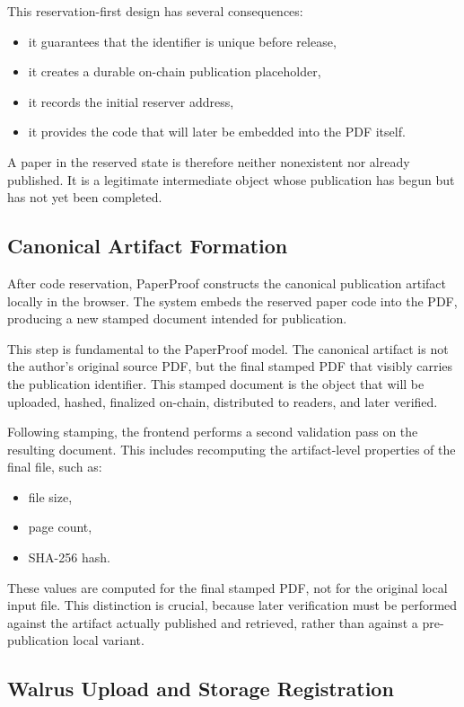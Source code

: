 \documentclass[journal]{IEEEtran}
\begin{document}
This reservation-first design has several consequences:
\begin{itemize}
    \item it guarantees that the identifier is unique before release,
    \item it creates a durable on-chain publication placeholder,
    \item it records the initial reserver address,
    \item it provides the code that will later be embedded into the PDF itself.
\end{itemize}


A paper in the reserved state is therefore neither nonexistent nor already published. It is a legitimate intermediate object whose publication has begun but has not yet been completed.

\subsection{Canonical Artifact Formation}

After code reservation, PaperProof constructs the canonical publication artifact locally in the browser. The system embeds the reserved paper code into the PDF, producing a new stamped document intended for publication.

This step is fundamental to the PaperProof model. The canonical artifact is not the author's original source PDF, but the final stamped PDF that visibly carries the publication identifier. This stamped document is the object that will be uploaded, hashed, finalized on-chain, distributed to readers, and later verified.

Following stamping, the frontend performs a second validation pass on the resulting document. This includes recomputing the artifact-level properties of the final file, such as:
\begin{itemize}
    \item file size,
    \item page count,
    \item SHA-256 hash.
\end{itemize}


These values are computed for the final stamped PDF, not for the original local input file. This distinction is crucial, because later verification must be performed against the artifact actually published and retrieved, rather than against a pre-publication local variant.

\subsection{Walrus Upload and Storage Registration}
\end{document}
